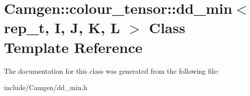 \hypertarget{a00121}{\section{Camgen\-:\-:colour\-\_\-tensor\-:\-:dd\-\_\-min$<$ rep\-\_\-t, I, J, K, L $>$ Class Template Reference}
\label{a00121}
}


The documentation for this class was generated from the following file\-:\begin{DoxyCompactItemize}
\item 
include/\-Camgen/dd\-\_\-min.\-h\end{DoxyCompactItemize}
